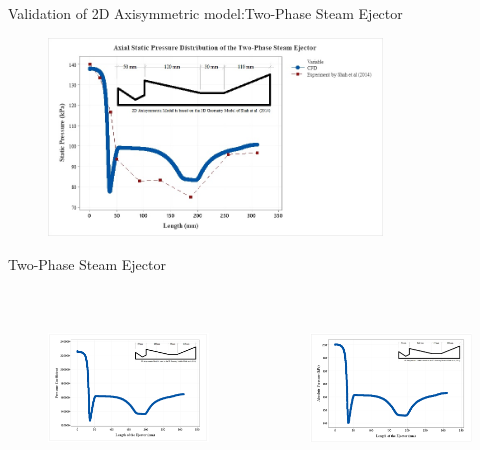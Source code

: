 \begin{frame}{Validation of 2D Axisymmetric model:Two-Phase Steam Ejector}
    \begin{figure}
        \centering
        \includegraphics[height=5.25cm]{images/ValidationPressureProfile.jpg}
        \label{fig:shahexperimental}
    \end{figure}
\end{frame}

\begin{frame}{Two-Phase Steam Ejector}
    \begin{columns}
    \begin{figure}
        \centering
        \includegraphics[height=4.5cm]{images/tpseprescoef.png}
    \end{figure}
  \begin{figure}
        \centering
        \includegraphics[height=4.5cm]{images/tpseabspres.png}
    \end{figure}
 \end{columns}
\end{frame}

